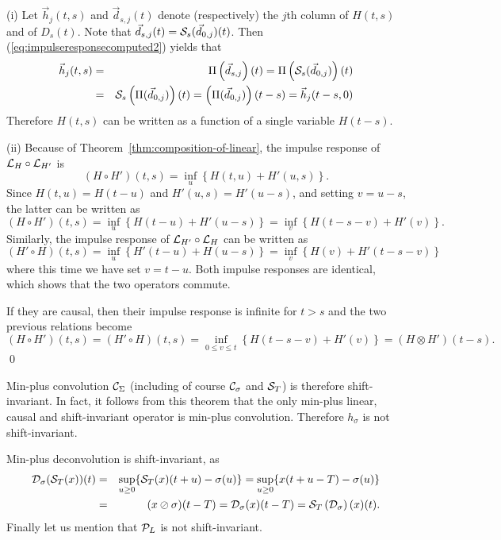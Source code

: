 \pr (i) Let $\vec{h}_j(t,s)$ and $\vec{d}_{s,j}(t)$ denote (respectively) the $j$th column of $H(t,s)$ and of $D_s(t)$.
Note that $\vec{d}_{s,j}(t) =  \mathcal S_s(\vec{d}_{0,j})(t)$. Then (\ref{eq:impulseresponsecomputed2}) yields that
\begin{eqnarray*}
\vec{h}_{j}(t,s) & = & \Pi \left( \vec{d}_{s,j} \right)(t) =  \Pi \left( \mathcal S_s( \vec{d}_{0,j} ) \right)(t) \\
        & = & \mathcal S_s \left( \Pi ( \vec{d}_{0,j} ) \right)(t) = \left( \Pi ( \vec{d}_{0,j} ) \right)(t-s) = \vec{h}_{j}(t-s,0)
\end{eqnarray*}
Therefore $H(t,s)$ can be written as a function of a single variable $H(t-s)$.

\vspace{1ex}
\noindent
(ii) Because of Theorem~\ref{thm:composition-of-linear}, the impulse response of $\mathcal L_{H} \circ \mathcal L_{H'}$ is
$$ (H \circ H')(t,s)  = \inf_{u} \left\{ H(t,u) + H'(u,s) \right\}. $$
Since $H(t,u) = H(t-u)$ and $H'(u,s) = H'(u-s)$, and setting $v = u-s$, the latter can be written as
$$ (H \circ H')(t,s)  =   \inf_{u} \left\{ H(t-u) + H'(u-s) \right\} =  \inf_{v} \left\{ H(t-s-v) + H'(v) \right\}. $$
Similarly, the impulse response of $\mathcal L_{H'} \circ \mathcal L_{H}$ can be written as
$$ (H' \circ H)(t,s)  =   \inf_{u} \left\{ H'(t-u) + H(u-s) \right\} =  \inf_{v} \left\{ H(v) + H'(t-s-v) \right\} $$
where this time we have set $v = t-u$. Both impulse responses are identical, which shows that the two operators commute.

If they are causal, then their impulse response is infinite for $t > s$ and the two previous relations become
$$ (H \circ H')(t,s) =  (H' \circ H)(t,s) = \inf_{0 \leq v \leq t} \left\{ H(t-s-v) + H'(v) \right\} = (H \otimes H')(t-s) . $$
\qed

Min-plus convolution $\mathcal C_{\Sigma}$ (including of course $\mathcal C_{\sigma}$ and $\mathcal S_T$) is therefore shift-invariant.
In fact, it follows from this theorem that the only min-plus linear, causal and shift-invariant operator is min-plus convolution.
Therefore $h_{\sigma}$ is not shift-invariant.

Min-plus deconvolution is shift-invariant, as
\begin{eqnarray*}
\mathcal D_{\sigma}(\mathcal S_T(x))(t) & = & \sup_{u \geq 0} \{ \mathcal S_T(x)(t+u) - \sigma(u) \} =  \sup_{u \geq 0} \{ x(t+u-T) - \sigma(u) \} \\
            & = & (x \oslash \sigma) (t-T) = \mathcal D_{\sigma}(x)(t-T) = \mathcal S_T \left( \mathcal D_{\sigma}  \right)(x)(t).
\end{eqnarray*}
Finally let us mention that $\mathcal P_L$ is not shift-invariant.


